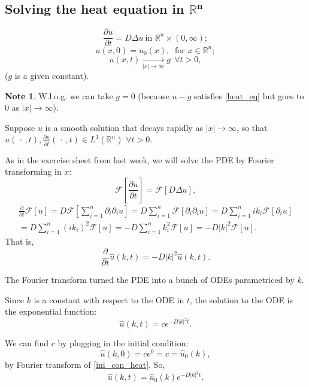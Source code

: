 \documentclass[12pt]{article}
\theoremstyle{definition}
\newtheorem*{note}{Note}
\begin{document}
\subsection[Solving the heat equation in \texorpdfstring{$\mathbb{R}^n$}{R\textasciicircum n}]{Solving the heat equation in \texorpdfstring{$\boldsymbol{\mathbb{R}^n}$}{R\textasciicircum n}}
\begin{equation}\tag{H}\label{heat_eq}
\frac{\partial u}{\partial t}=D\Delta u\ \text{
in }\mathbb{R}^n\times(0,\infty);
\end{equation}
\begin{equation}\tag{IC}\label{ini_con_heat}
u(x,0)=u_0(x),\ \text{ for }x\in\mathbb{R}^n;
\end{equation}
\begin{equation}\tag{BC}\label{boun_con_heat}
u(x,t)\xrightarrow[|x|\to\infty]{}g\ \ \forall t>0,
\end{equation}
($g$ is a given constant).

\begin{note}
W.l.o.g. we can take $g=0$ (because $u-g$ satisfies \eqref{heat_eq} but goes to $0$ as $|x|\to\infty$).
\end{note}

Suppose $u$ is a smooth solution that decays rapidly as $|x|\to\infty$, so that $u(\,\cdot\,,t),\frac{\partial u}{\partial t}(\,\cdot\,,t)\in L^1(\mathbb{R}^n)$ $\forall t>0$.

As in the exercise sheet from last week, we will solve the PDE by Fourier transforming in $x$:
\[\mathcal{F}\left[\frac{\partial u}{\partial t}\right]=\mathcal{F}[D\Delta u],\]
\begin{multline*}
\frac{\partial}{\partial t}\mathcal{F}[u]=D\mathcal{F}\left[\sum_{i=1}^n\partial_i\partial_iu\right]=D\sum_{i=1}^n\mathcal{F}[\partial_i\partial_iu]=D\sum_{i=1}^nik_i\mathcal{F}[\partial_iu]\\
=D\sum_{i=1}^n(ik_i)^2\mathcal{F}[u]=-D\sum_{i=1}^nk_i^2\mathcal{F}[u]=-D|k|^2\mathcal{F}[u].
\end{multline*}
That is,
\[\frac{\partial}{\partial t}\hat{u}(k,t)=-D|k|^2\hat{u}(k,t).\]

The Fourier transform turned the PDE into a bunch of ODEs parametriced by $k$.

Since $k$ is a constant with respect to the ODE in $t$, the solution to the ODE is the exponential function:
\[\hat{u}(k,t)=ce^{-D|k|^2t}.\]

We can find $c$ by plugging in the initial condition:
\[\hat{u}(k,0)=ce^0=c=\hat{u}_0(k),\]
by Fourier transform of \eqref{ini_con_heat}. So,
\[\hat{u}(k,t)=\hat{u}_0(k)e^{-D|k|^2t}.\]
\end{document}
